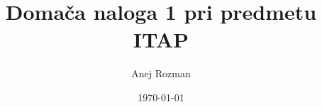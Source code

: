\documentclass[a4paper, 12pt]{article}
\begin{document}
\title{Domača naloga 1 pri predmetu ITAP}
\author{Anej Rozman}
\date{\today}
\maketitle
\end{document}
